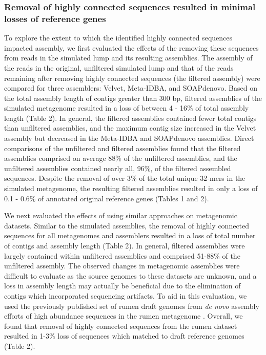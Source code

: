 \documentclass[10pt]{article}
\begin{document}
\subsubsection*{Removal of highly connected sequences resulted in minimal losses of reference genes}
To explore the extent to which the identified highly connected
sequences impacted assembly, we first evaluated the effects of the
removing these sequences from reads in the simulated lump and its
resulting assemblies.  The assembly of the reads in the original,
unfiltered simulated lump and that of the reads remaining after
removing highly connected sequences (the filtered assembly) were
compared for three assemblers: Velvet, Meta-IDBA, and SOAPdenovo.
Based on the total assembly length of contigs greater than 300 bp,
filtered assemblies of the simulated metagenome resulted in a loss of
between 4 - 16\% of total assembly length (Table 2).  In general, the
filtered assemblies contained fewer total contigs than unfiltered
assemblies, and the maximum contig size increased in the Velvet
assembly but decreased in the Meta-IDBA and SOAPdenovo assemblies.
Direct comparisons of the unfiltered and filtered assemblies found
that the filtered assemblies comprised on average 88\% of the
unfiltered assemblies, and the unfiltered assemblies contained nearly
all, 96\%, of the filtered assembled sequences.  Despite the removal
of over 3\% of the total unique 32-mers in the simulated metagenome,
the resulting filtered assemblies resulted in only a loss of 0.1 -
0.6\% of annotated original reference genes (Tables 1 and 2).

We next evaluated the effects of using similar approaches on
metagenomic datasets.  Similar to the simulated assemblies, the
removal of highly connected sequences for all metagenomes and
assemblers resulted in a loss of total number of contigs and assembly
length (Table 2).  In general, filtered assemblies were largely
contained within unfiltered assemblies and comprised 51-88\% of the
unfiltered assembly.  The observed changes in metagenomic assemblies
were difficult to evaluate as the source genomes to these datasets are
unknown, and a loss in assembly length may actually be beneficial due
to the elimination of contigs which incorporated sequencing artifacts.
To aid in this evaluation, we used the previously published set of
rumen draft genomes from \emph{de novo} assembly efforts of high
abundance sequences in the rumen metagenome \cite{Hess:2011p686}.
Overall, we found that removal of highly connected sequences from the
rumen dataset resulted in 1-3\% loss of sequences which matched to
draft reference genomes (Table 2).
\end{document}
